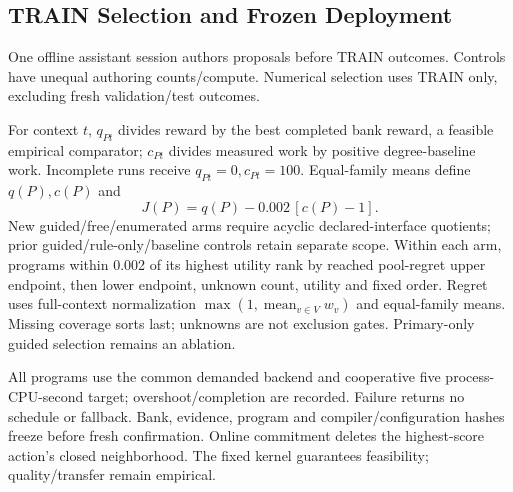 \subsection{TRAIN Selection and Frozen Deployment}
\label{sec:method:selection}
One offline assistant session authors proposals before TRAIN outcomes.
Controls have unequal authoring counts/compute. Numerical selection uses
TRAIN only, excluding fresh validation/test outcomes.

For context $t$, $q_{Pt}$ divides reward by the best completed bank reward,
a feasible empirical comparator; $c_{Pt}$ divides measured work by positive
degree-baseline work. Incomplete runs receive $q_{Pt}=0,c_{Pt}=100$.
Equal-family means define $q(P),c(P)$ and
\begin{equation}
 J(P)=q(P)-0.002\,[c(P)-1].
 \label{eq:joint-utility}
\end{equation}
New guided/free/enumerated arms require acyclic declared-interface quotients;
prior guided/rule-only/baseline controls retain separate scope. Within each
arm, programs within 0.002 of its highest utility rank by reached
pool-regret upper endpoint,
then lower endpoint, unknown count, utility and fixed order. Regret uses
full-context normalization $\max(1,\operatorname{mean}_{v\in V}w_v)$ and
equal-family means. Missing coverage sorts last; unknowns are not exclusion
gates. Primary-only guided selection remains an ablation.

All programs use the common demanded backend and cooperative five
process-CPU-second target;
overshoot/completion are recorded. Failure returns no schedule or fallback.
Bank, evidence, program and compiler/configuration hashes freeze before
fresh confirmation. Online commitment deletes the highest-score action's
closed neighborhood. The fixed kernel guarantees feasibility;
quality/transfer remain empirical.
